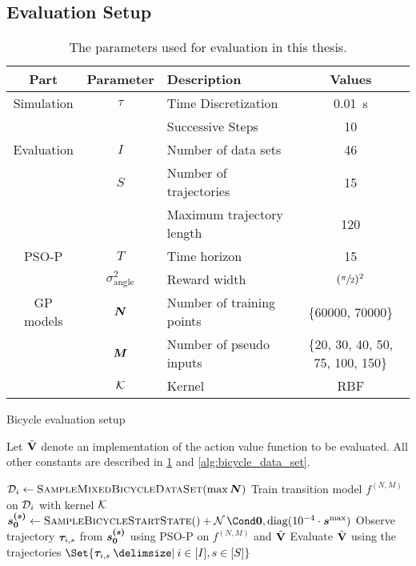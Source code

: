 \subsection{Evaluation Setup}
\begin{table}[t]
    \centering
    \caption{The parameters used for evaluation in this thesis.}
    \label{tab:evaluation_parameters}
    \begin{tabularx}{\tablewidth}{ccXc}
        \toprule
        Part & Parameter & Description & Values \\
        \midrule
        Simulation & $\tau$ & Time Discretization & \SI[mode=text]{0.01}{\second} \\
        & & Successive Steps & 10 \\
        \addlinespace
        Evaluation & $I$ & Number of data sets & 46 \\
        & $S$ & Number of trajectories & 15 \\
        & & Maximum trajectory length & 120 \\
        \addlinespace
        PSO-P & $T$ & Time horizon & 15 \\
        & $\sigma_{\text{angle}}^2$ & Reward width & $(\sfrac{\pi}{2})^2$ \\
        \addlinespace
        GP models & $\bm{N}$ & Number of training points & \{60000, 70000\} \\
        & $\bm{M}$ & Number of pseudo inputs & \{20, 30, 40, 50, 75, 100, 150\} \\
        & $\operatorname{\mathcal{K}}$ & Kernel & RBF \\
        \bottomrule
    \end{tabularx}
\end{table}
\begin{algorithm}[tp]
    \caption{Bicycle evaluation setup}
    \label{alg:evaluation_setup}
    Let $\operatorname{\hat{\operatorname{\mathbf{V}}}}$ denote an implementation of the action value function to be evaluated.
    All other constants are described in \cref{tab:evaluation_parameters} and \cref{alg:bicycle_data_set}.
    \begin{algorithmic}[1]
            \State $\D_i \gets \Call{SampleMixedBicycleDataSet}{\max \mat{N}}$
                \State Train transition model $f^{(N, M)}$ on $\mathcal{D}_i$ with kernel $\operatorname{\mathcal{K}}$
                \State $\mat{s^{(s)}_0} \gets \Call{SampleBicycleStartState}{\null} + \Gaussian{\mat{0}, \diag(10^{-4} \cdot \mat{s}^{\text{max}})}$
                    \State Observe trajectory $\bm{\tau}_{i, s}$ from $\bm{s^{(s)}_0}$ using PSO-P on $f^{(N, M)}$ and $\operatorname{\hat{\operatorname{\mathbf{V}}}}$
                \EndFor
            \EndFor
        \EndFor
        \State Evaluate $\operatorname{\hat{\operatorname{\mathbf{V}}}}$ using the trajectories $\Set{\Trajectory_{i, s} \with i \in [I], s \in [S]}$
    \end{algorithmic}
\end{algorithm}
